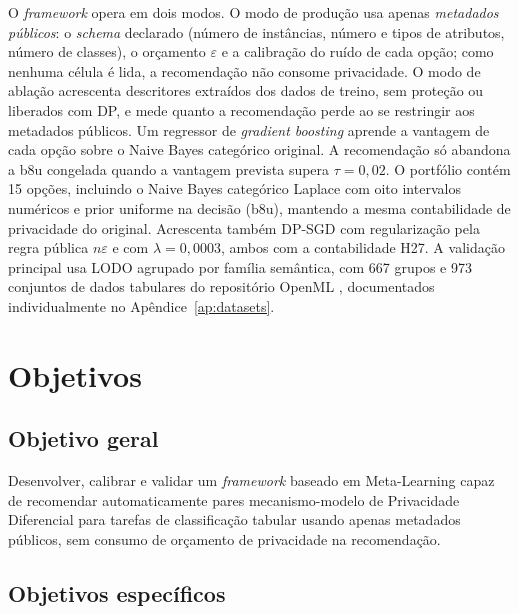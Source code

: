 O \textit{framework} opera em dois modos. O modo de produção usa apenas \emph{metadados públicos}: o \textit{schema} declarado (número de instâncias, número e tipos de atributos, número de classes), o orçamento $\varepsilon$ e a calibração do ruído de cada opção; como nenhuma célula é lida, a recomendação não consome privacidade. O modo de ablação acrescenta descritores extraídos dos dados de treino, sem proteção ou liberados com DP, e mede quanto a recomendação perde ao se restringir aos metadados públicos. Um regressor de \textit{gradient boosting} aprende a vantagem de cada opção sobre o Naive Bayes categórico original. A recomendação só abandona a b8u congelada quando a vantagem prevista supera $\tau=0{,}02$. O portfólio contém 15 opções, incluindo o Naive Bayes categórico Laplace com oito intervalos numéricos e prior uniforme na decisão (b8u), mantendo a mesma contabilidade de privacidade do original. Acrescenta também DP-SGD com regularização pela regra pública $n\varepsilon$ e com $\lambda=0{,}0003$, ambos com a contabilidade H27. A validação principal usa LODO agrupado por família semântica, com 667 grupos e 973 conjuntos de dados tabulares do repositório OpenML \cite{ref07,ref28}, documentados individualmente no Apêndice~\ref{ap:datasets}.

\section{Objetivos}
\label{sec:objetivos}

\subsection{Objetivo geral}
\label{sec:objetivo-geral}

Desenvolver, calibrar e validar um \textit{framework} baseado em Meta-Learning capaz de recomendar automaticamente pares mecanismo-modelo de Privacidade Diferencial para tarefas de classificação tabular usando apenas metadados públicos, sem consumo de orçamento de privacidade na recomendação.

\subsection{Objetivos específicos}
\label{sec:objetivos-especificos}

